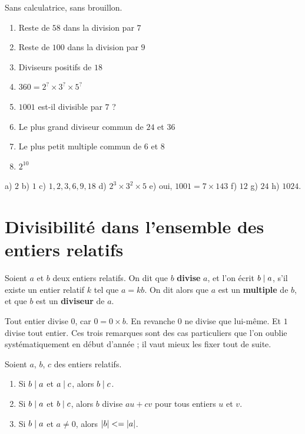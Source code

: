 \begin{automatismes}
Sans calculatrice, sans brouillon.

\begin{enumerate}[label=\textbf{\alph*)}, leftmargin=*, itemsep=0.25em]
  \item Reste de $58$ dans la division par $7$
  \item Reste de $100$ dans la division par $9$
  \item Diviseurs positifs de $18$
  \item $360 = 2^{?}\times3^{?}\times5^{?}$
  \item $1001$ est-il divisible par $7$ ?
  \item Le plus grand diviseur commun de $24$ et $36$
  \item Le plus petit multiple commun de $6$ et $8$
  \item $2^{10}$
\end{enumerate}
\end{automatismes}

\begin{corrige}[automatismes]
a) $2$ \quad b) $1$ \quad c) $1,2,3,6,9,18$ \quad
d) $2^{3}\times3^{2}\times5$ \quad e) oui, $1001 = 7\times143$ \quad
f) $12$ \quad g) $24$ \quad h) $1024$.
\end{corrige}

\section{Divisibilité dans l'ensemble des entiers relatifs}

\begin{definition}
Soient $a$ et $b$ deux entiers relatifs. On dit que $b$ \textbf{divise} $a$,
et l'on écrit $b \mid a$, s'il existe un entier relatif $k$ tel que
$a = kb$. On dit alors que $a$ est un \textbf{multiple} de $b$, et que $b$ est
un \textbf{diviseur} de $a$.
\end{definition}

\begin{remarque}
Tout entier divise $0$, car $0 = 0 \times b$. En revanche $0$ ne divise que
lui-même. Et $1$ divise tout entier. Ces trois remarques sont des cas
particuliers que l'on oublie systématiquement en début d'année ; il vaut mieux
les fixer tout de suite.
\end{remarque}

\begin{propriete}
Soient $a$, $b$, $c$ des entiers relatifs.
\begin{enumerate}[label=\textbf{\arabic*.}, leftmargin=*, itemsep=0.15em]
  \item Si $b \mid a$ et $a \mid c$, alors $b \mid c$.
  \item Si $b \mid a$ et $b \mid c$, alors $b$ divise $au+cv$ pour tous
        entiers $u$ et $v$.
  \item Si $b \mid a$ et $a \neq 0$, alors $\left|b\right| <= \left|a\right|$.
\end{enumerate}
\end{propriete}

